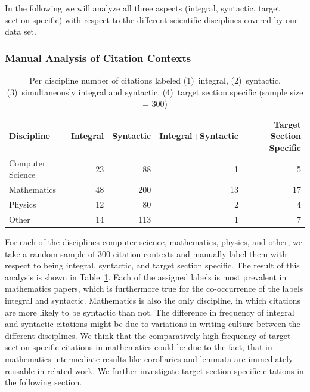 In the following we will analyze all three aspects (integral, syntactic, target section specific) with respect to the different scientific disciplines covered by our data set.

\subsubsection{Manual Analysis of Citation Contexts}

\begin{table}[tb]
\centering
  \caption[Per discipline number of citations labeled integral, syntactic, imultaneously integral and syntactic, target section specific]{Per discipline number of citations labeled (1)~integral, (2)~syntactic, (3)~simultaneously integral and syntactic, (4)~target section specific (sample size = 300)}
  \label{tbl:integralsyntacticsecspec}
\begin{small}
\begin{tabular}{lrrrr}
\toprule
   Discipline & Integral & Syntactic & Integral+Syntactic & Target Section Specific \\
   \midrule
   Computer Science & 23 & 88 & 1 & 5 \\
   Mathematics & 48 & 200 & 13 & 17 \\
   Physics & 12 & 80 & 2 & 4 \\
   Other & 14 & 113 & 1 & 7 \\
  \bottomrule
\end{tabular}
\end{small}
\end{table}

For each of the disciplines computer science, mathematics, physics, and other, we take a random sample of 300 citation contexts and manually label them with respect to being integral, syntactic, and target section specific. The result of this analysis is shown in Table~\ref{tbl:integralsyntacticsecspec}. Each of the assigned labels is most prevalent in mathematics papers, which is furthermore true for the co-occurrence of the labels integral and syntactic. Mathematics is also the only discipline, in which citations are more likely to be syntactic than not. The difference in frequency of integral and syntactic citations might be due to variations in writing culture between the different disciplines. We think that the comparatively high frequency of target section specific citations in mathematics could be due to the fact, that in mathematics intermediate results like corollaries and lemmata are immediately reusable in related work. We further investigate target section specific citations in the following section.

